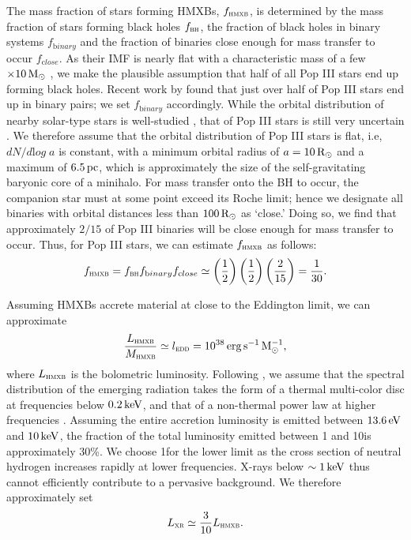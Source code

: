 \documentclass[../thesis.tex]{subfiles}
\begin{document}
The mass fraction of stars forming HMXBs, $f_{\textsc{hmxb}}$, is determined by
the mass fraction of stars forming black holes $f_{\textsc{bh}}$, the
fraction of black holes in binary systems $f_{\mathrm binary}$ and the
fraction of binaries close enough for mass transfer to occur
$f_{\mathrm close}$. As their IMF is nearly flat with a characteristic
mass of a few $\times10\,\mathrm{M}_{\odot}$ \citep{Bromm2013}, we make the
plausible assumption that half of all Pop III stars end up forming
black holes.  Recent work by \citet{StacyBromm2013} found that just
over half of Pop III stars end up in binary pairs; we set $f_{\mathrm
  binary}$ accordingly. While the orbital distribution of nearby
solar-type stars is well-studied \citep[e.g.,][]{DuquennoyMayor1991},
that of Pop III stars is still very uncertain \citep[but
see][]{StacyBromm2013}.  We therefore assume that the orbital
distribution of Pop III stars is flat, i.e, $dN/d{\mathrm log} \; a$ is
constant, with a minimum orbital radius of $a=10\,\mathrm{R}_{\odot}$ and a maximum of
$6.5\,\mathrm{pc}$, which is approximately the size of the self-gravitating baryonic core of a minihalo. For mass transfer onto the BH to occur, the companion star
must at some point exceed its Roche limit; hence we designate all
binaries with orbital distances less than $100\,\mathrm{R}_{\odot}$ as `close.'
Doing so, we find that approximately $2/15$ of Pop III binaries will be
close enough for mass transfer to occur.
 Thus, for Pop III stars, we can estimate $f_{\textsc{hmxb}}$ as follows:  
\begin{equation}
  f_{\textsc{hmxb}} = f_{\textsc{bh}} f_{\mathrm binary} f_{\mathrm close} \simeq \left(\frac{1}{2}\right) 
  \left(\frac{1}{2}\right) \left(\frac{2}{15}\right) = \frac{1}{30}.
\end{equation}

Assuming HMXBs accrete material at close to the Eddington limit, we can approximate 
\begin{equation}
  \frac{L_{\textsc{hmxb}}}{M_{\textsc{hmxb}}} \simeq l_\textsc{edd} = 10^{38} \,\mathrm{erg} \,\mathrm{s}^{-1} \,\mathrm{M}_{\odot}^{-1},
\end{equation}
where $L_{\textsc{hmxb}}$ is the bolometric luminosity.  Following \citet{Jeonetal2014a}, we assume that the spectral distribution of the
emerging radiation takes the form of a thermal multi-color disc at
frequencies below $0.2 \,\mathrm{keV}$, and that of a non-thermal power law at
higher frequencies \citep[e.g.,][]{Mitsudaetal1984}.  Assuming the entire accretion luminosity is
emitted between $13.6\,\mathrm{eV}$ and $10\,\mathrm{keV}$, the fraction of the total
luminosity emitted between 1 and 10\kev is approximately 30\%.  We
choose 1\kev for the lower limit as the cross section of neutral
hydrogen increases rapidly at lower frequencies.   X-rays below
$\sim1\,\mathrm{keV}$ thus cannot efficiently contribute to a pervasive
background.  We therefore approximately set
\begin{equation}
L_{\textsc{xr}} \simeq \frac{3}{10} L_{\textsc{hmxb}}.
\end{equation}
\end{document}
